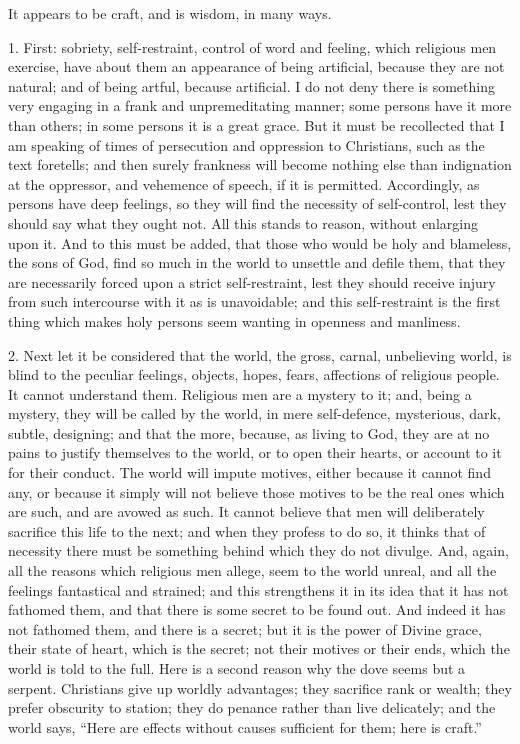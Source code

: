 It appears to be craft, and is wisdom, in many ways.

1. First: sobriety, self-restraint, control of word and feeling,
which religious men exercise, have about them an appearance of being
artificial, because they are not natural; and of being artful, because
artificial. I do not deny there is something very engaging in a frank
and unpremeditating manner; some persons have it more than others; in
some persons it is a great grace. But it must be recollected that I am
speaking of times of persecution and oppression to Christians, such as
the text foretells; and then surely frankness will become nothing else
than indignation at the oppressor, and vehemence of speech, if it is
permitted. Accordingly, as persons have deep feelings, so they will
find the necessity of self-control, lest they should say what they
ought not. All this stands to reason, without enlarging upon it. And
to this must be added, that those who would be holy and blameless, the
sons of God, find so much in the world to unsettle and defile them,
that they are necessarily forced upon a strict self-restraint, lest
they should receive injury from such intercourse with it as is
unavoidable; and this self-restraint is the first thing which makes
holy persons seem wanting in openness and manliness.

2. Next let it be considered that the world, the gross, carnal,
unbelieving world, is blind to the peculiar feelings, objects, hopes,
fears, affections of religious people. It cannot understand them.
Religious men are a mystery to it; and, being a mystery, they will be
called by the world, in mere self-defence, mysterious, dark, subtle,
designing; and that the more, because, as living to God, they are at
no pains to justify themselves to the world, or to open their hearts,
or account to it for their conduct. The world will impute motives,
either because it cannot find any, or because it simply will not
believe those motives to be the real ones which are such, and are
avowed as such. It cannot believe that men will deliberately sacrifice
this life to the next; and when they profess to do so, it thinks that
of necessity there must be something behind which they do not divulge.
And, again, all the reasons which religious men allege, seem to the
world unreal, and all the feelings fantastical and strained; and this
strengthens it in its idea that it has not fathomed them, and that
there is some secret to be found out. And indeed it has not fathomed
them, and there is a secret; but it is the power of Divine grace,
their state of heart, which is the secret; not their motives or their
ends, which the world is told to the full. Here is a second reason why
the dove seems but a serpent. Christians give up worldly advantages;
they sacrifice rank or wealth; they prefer obscurity to station; they
do penance rather than live delicately; and the world says, ``Here
are effects without causes sufficient for them; here is craft.''

